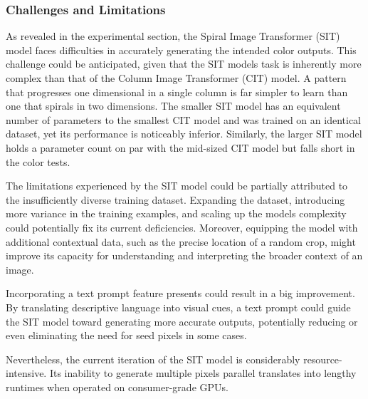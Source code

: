     \subsubsection{Challenges and Limitations}

    As revealed in the experimental section, the Spiral Image Transformer (SIT) model faces difficulties in accurately generating the intended color outputs. This challenge could be anticipated, given that the SIT models task is inherently more complex than that of the Column Image Transformer (CIT) model. A pattern that progresses one dimensional in a single column is far simpler to learn than one that spirals in two dimensions. The smaller SIT model has an equivalent number of parameters to the smallest CIT model and was trained on an identical dataset, yet its performance is noticeably inferior. Similarly, the larger SIT model holds a parameter count on par with the mid-sized CIT model but falls short in the color tests.

    The limitations experienced by the SIT model could be partially attributed to the insufficiently diverse training dataset. Expanding the dataset, introducing more variance in the training examples, and scaling up the models complexity could potentially fix its current deficiencies. Moreover, equipping the model with additional contextual data, such as the precise location of a random crop, might improve its capacity for understanding and interpreting the broader context of an image.

    Incorporating a text prompt feature presents could result in a big improvement. By translating descriptive language into visual cues, a text prompt could guide the SIT model toward generating more accurate outputs, potentially reducing or even eliminating the need for seed pixels in some cases.

    Nevertheless, the current iteration of the SIT model is considerably resource-intensive. Its inability to generate multiple pixels parallel translates into lengthy runtimes when operated on consumer-grade GPUs.

